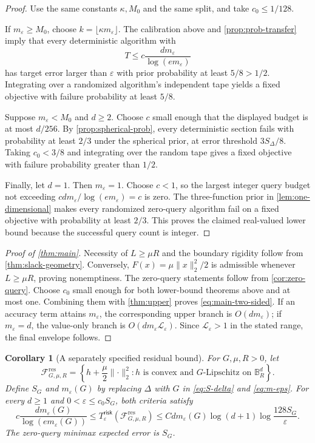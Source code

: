 \documentclass[11pt]{article}
\newcommand{\logfac}{\mathcal L_\eps}
\newcommand{\B}{\mathbb{B}}
\newcommand{\cF}{\mathcal{F}}
\newcommand{\eps}{\varepsilon}
\newcommand{\norm}[1]{\lVert #1\rVert_2}
\theoremstyle{plain}
\newtheorem{corollary}[corollary]{Corollary}
\theoremstyle{definition}
\begin{document}
\begin{proof}
Use the same constants $\kappa,M_0$ and the same split, and take
$c_0\le1/128$.

If $m_\eps\ge M_0$, choose $k=\lfloor\kappa m_\eps\rfloor$.  The calibration above and \cref{prop:prob-transfer} imply that every deterministic algorithm with
\[
  T\le c\frac{dm_\eps}{\log(em_\eps)}
\]
has target error larger than $\eps$ with prior probability at least $5/8>1/2$.  Integrating over a randomized algorithm's independent tape yields a fixed objective with failure probability at least $5/8$.

Suppose $m_\eps<M_0$ and $d\ge2$.  Choose $c$ small enough that the displayed budget is at most $d/256$.  By \cref{prop:spherical-prob}, every deterministic section fails with probability at least $2/3$ under the spherical prior, at error threshold $3S_\Delta/8$.  Taking $c_0<3/8$ and integrating over the random tape gives a fixed objective with failure probability greater than $1/2$.

Finally, let $d=1$.  Then $m_\eps=1$.  Choose $c<1$, so the largest integer query budget not exceeding $c d m_\eps/\log(em_\eps)=c$ is zero.  The three-function prior in \cref{lem:one-dimensional} makes every randomized zero-query algorithm fail on a fixed objective with probability at least $2/3$.  This proves the claimed real-valued lower bound because the successful query count is integer.
\end{proof}


\begin{proof}[Proof of \cref{thm:main}]
Necessity of $L\ge\mu R$ and the boundary rigidity follow from
\cref{thm:slack-geometry}. Conversely, $F(x)=\mu\norm{x}^2/2$
is admissible whenever $L\ge\mu R$, proving nonemptiness.
The zero-query statements follow from \cref{cor:zero-query}.
Choose $c_0$ small enough for both lower-bound theorems above and
at most one. Combining them with \cref{thm:upper} proves
\eqref{eq:main-two-sided}. If an accuracy term attains $m_\eps$,
the corresponding upper branch is $O(d m_\eps)$; if $m_\eps=d$,
the value-only branch is $O(d m_\eps\logfac)$. Since $\logfac>1$
in the stated range, the final envelope follows.
\end{proof}

\begin{corollary}[A separately specified residual bound]\label{cor:residual}
For $G,\mu,R>0$, let
\[
 \cF^{\mathrm{res}}_{G,\mu,R}
 =\left\{h+\frac{\mu}{2}\norm{\cdot}^2:
        h\text{ is convex and }G\text{-Lipschitz on }\B_R^d\right\}.
\]
Define $S_G$ and $m_\eps(G)$ by replacing $\Delta$ with $G$ in
\eqref{eq:S-delta} and \eqref{eq:m-eps}. For every $d\ge1$ and
$0<\eps\le c_0S_G$, both criteria satisfy
\[
 c\frac{d m_\eps(G)}{\log(e m_\eps(G))}
 \le T_\eps^{\mathsf{risk}}(\cF^{\mathrm{res}}_{G,\mu,R})
 \le C d m_\eps(G)\log(d+1)\log\!\frac{128S_G}{\eps}.
\]
The zero-query minimax expected error is $S_G$.
\end{corollary}
\end{document}
